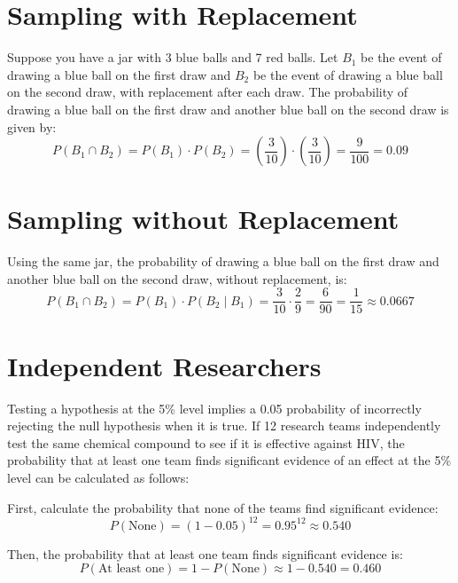 \documentclass{article}
\begin{document}
\section{Sampling with Replacement}

Suppose you have a jar with 3 blue balls and 7 red balls. Let \( B_1 \) be the event of drawing a blue ball on the first draw and \( B_2 \) be the event of drawing a blue ball on the second draw, with replacement after each draw. The probability of drawing a blue ball on the first draw and another blue ball on the second draw is given by:
\[
P(B_1 \cap B_2) = P(B_1) \cdot P(B_2) = \left(\frac{3}{10}\right) \cdot \left(\frac{3}{10}\right) = \frac{9}{100} = 0.09
\]

\section{Sampling without Replacement}

Using the same jar, the probability of drawing a blue ball on the first draw and another blue ball on the second draw, without replacement, is:
\[
P(B_1 \cap B_2) = P(B_1) \cdot P(B_2 \mid B_1) = \frac{3}{10} \cdot \frac{2}{9} = \frac{6}{90} = \frac{1}{15} \approx 0.0667
\]

\section{Independent Researchers}

Testing a hypothesis at the 5\% level implies a 0.05 probability of incorrectly rejecting the null hypothesis when it is true. If 12 research teams independently test the same chemical compound to see if it is effective against HIV, the probability that at least one team finds significant evidence of an effect at the 5\% level can be calculated as follows:

First, calculate the probability that none of the teams find significant evidence:
\[
P(\text{None}) = (1 - 0.05)^{12} = 0.95^{12} \approx 0.540
\]

Then, the probability that at least one team finds significant evidence is:
\[
P(\text{At least one}) = 1 - P(\text{None}) \approx 1 - 0.540 = 0.460
\]
\end{document}
